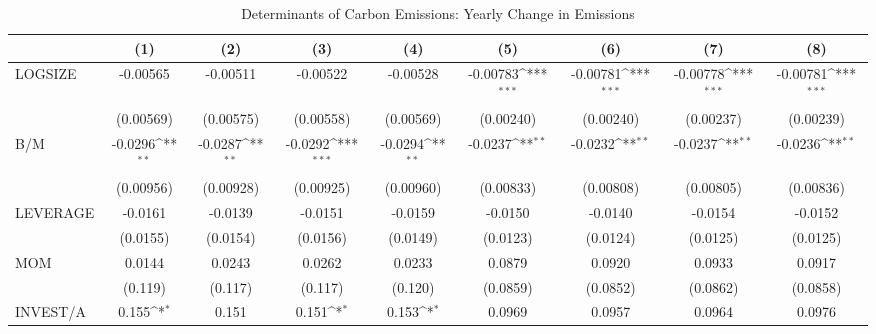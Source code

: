 \begin{table}[htbp]\centering
\def\sym#1{\ifmmode^{#1}\else\(^{#1}\)\fi}
\caption{Determinants of Carbon Emissions: Yearly Change in Emissions}
\begin{tabular}{l*{8}{c}}
\hline\hline
                    &\multicolumn{1}{c}{(1)}         &\multicolumn{1}{c}{(2)}         &\multicolumn{1}{c}{(3)}         &\multicolumn{1}{c}{(4)}         &\multicolumn{1}{c}{(5)}         &\multicolumn{1}{c}{(6)}         &\multicolumn{1}{c}{(7)}         &\multicolumn{1}{c}{(8)}         \\
\hline
LOGSIZE             &    -0.00565         &    -0.00511         &    -0.00522         &    -0.00528         &    -0.00783\sym{***}&    -0.00781\sym{***}&    -0.00778\sym{***}&    -0.00781\sym{***}\\
                    &   (0.00569)         &   (0.00575)         &   (0.00558)         &   (0.00569)         &   (0.00240)         &   (0.00240)         &   (0.00237)         &   (0.00239)         \\
B/M                 &     -0.0296\sym{**} &     -0.0287\sym{**} &     -0.0292\sym{***}&     -0.0294\sym{**} &     -0.0237\sym{**} &     -0.0232\sym{**} &     -0.0237\sym{**} &     -0.0236\sym{**} \\
                    &   (0.00956)         &   (0.00928)         &   (0.00925)         &   (0.00960)         &   (0.00833)         &   (0.00808)         &   (0.00805)         &   (0.00836)         \\
LEVERAGE            &     -0.0161         &     -0.0139         &     -0.0151         &     -0.0159         &     -0.0150         &     -0.0140         &     -0.0154         &     -0.0152         \\
                    &    (0.0155)         &    (0.0154)         &    (0.0156)         &    (0.0149)         &    (0.0123)         &    (0.0124)         &    (0.0125)         &    (0.0125)         \\
MOM                 &      0.0144         &      0.0243         &      0.0262         &      0.0233         &      0.0879         &      0.0920         &      0.0933         &      0.0917         \\
                    &     (0.119)         &     (0.117)         &     (0.117)         &     (0.120)         &    (0.0859)         &    (0.0852)         &    (0.0862)         &    (0.0858)         \\
INVEST/A            &       0.155\sym{*}  &       0.151         &       0.151\sym{*}  &       0.153\sym{*}  &      0.0969         &      0.0957         &      0.0964         &      0.0976         \\

\end{tabular}
\end{table}
